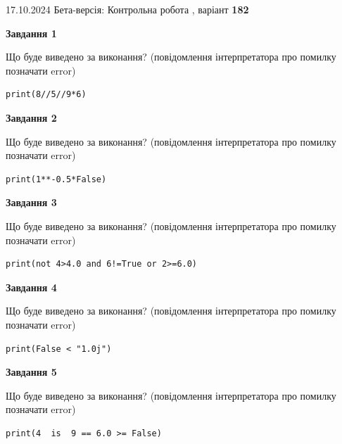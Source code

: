 \documentclass[12pt, ukrainian]{article}
\begin{document}
{\Large{17.10.2024 Бета-версія: Контрольна робота , варіант  \No \textbf { 182 }\par}}
{
\begin {large}
{\begin {center}\textbf{Завдання 1}\end {center}}

Що буде виведено за виконання? (повідомлення інтерпретатора про помилку позначати error)\par
\begin{verbatim}
print(8//5//9*6)
\end{verbatim}

{\begin {center}\textbf{Завдання 2}\end {center}}

Що буде виведено за виконання? (повідомлення інтерпретатора про помилку позначати error)\par
\begin{verbatim}
print(1**-0.5*False)
\end{verbatim}

{\begin {center}\textbf{Завдання 3}\end {center}}

Що буде виведено за виконання? (повідомлення інтерпретатора про помилку позначати error)\par
\begin{verbatim}
print(not 4>4.0 and 6!=True or 2>=6.0)
\end{verbatim}

{\begin {center}\textbf{Завдання 4}\end {center}}

Що буде виведено за виконання? (повідомлення інтерпретатора про помилку позначати error)\par
\begin{verbatim}
print(False < "1.0j")
\end{verbatim}

{\begin {center}\textbf{Завдання 5}\end {center}}

Що буде виведено за виконання? (повідомлення інтерпретатора про помилку позначати error)\par
\begin{verbatim}
print(4  is  9 == 6.0 >= False)
\end{verbatim}


\end{large}}
\end{document}
